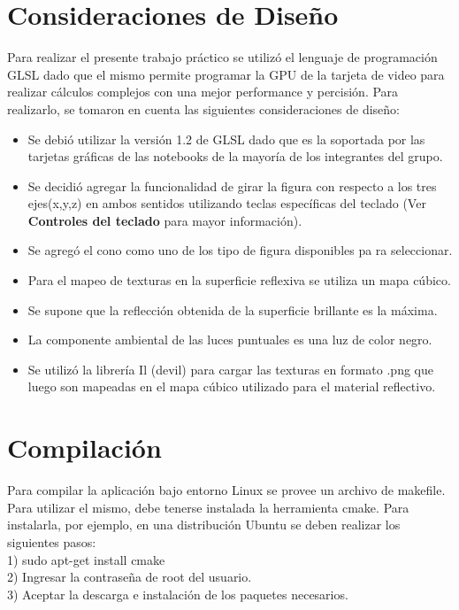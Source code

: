 \documentclass[11pt]{article}
\begin{document}
\begin{center}
\end{center}

\newpage


\section{Consideraciones de Dise\~no}
Para realizar el presente trabajo pr\'actico se utiliz\'o el lenguaje de programaci\'on GLSL dado que el mismo permite programar la GPU 
de la tarjeta de video para realizar c\'alculos complejos con una mejor performance y percisi\'on.
  Para realizarlo, se tomaron en cuenta las siguientes consideraciones de dise\~no:
\begin{itemize} 
 \item Se debi\'o utilizar la versi\'on 1.2 de GLSL dado que es la soportada por las tarjetas gr\'aficas de las notebooks de la mayor\'ia de 
los integrantes del grupo.
 \item Se decidi\'o agregar la funcionalidad de girar la figura con respecto a los tres ejes(x,y,z) en ambos sentidos utilizando teclas espec\'ificas del 
teclado (Ver {\bf Controles del teclado} para mayor informaci\'on).
 \item Se agreg\'o el cono como uno de los tipo de figura disponibles pa
ra seleccionar.
 \item Para el mapeo de texturas en la superficie reflexiva se utiliza un mapa c\'ubico.
 \item Se supone que la reflecci\'on obtenida de la superficie brillante es la m\'axima.
 \item La componente ambiental de las luces puntuales es una luz de color negro.
 \item Se utiliz\'o la librer\'ia Il (devil) para cargar las texturas en formato .png que luego son mapeadas en el mapa c\'ubico utilizado para el 
material reflectivo.
\end{itemize}


\newpage

\section{Compilaci\'on}
  Para compilar la aplicaci\'on bajo entorno Linux se provee un archivo de makefile.
  Para utilizar el mismo, debe tenerse instalada la herramienta cmake. Para instalarla, por ejemplo, en una distribuci\'on Ubuntu se deben 
realizar los siguientes pasos: \\
1) sudo apt-get install cmake \\
2) Ingresar la contrase\~na de root del usuario. \\
3) Aceptar la descarga e instalaci\'on de los paquetes necesarios. \\ 
\end{document}
